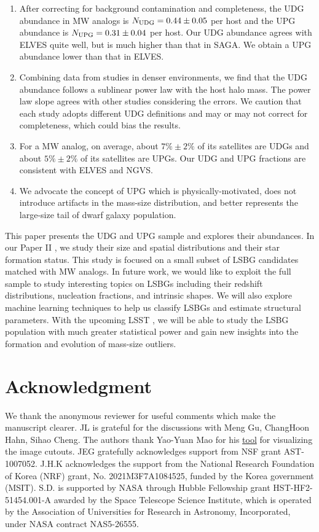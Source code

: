 \documentclass[twocolumn,astrosymb,twocolappendix,linenumbers]{aastex631}
\begin{document}
\begin{CJK*}{UTF8}{gbsn}
\begin{enumerate}
    \item After correcting for background contamination and completeness, the UDG abundance in MW analogs is $N_{\rm UDG} = 0.44\pm 0.05$ per host and the UPG abundance is $N_{\rm UPG} = 0.31 \pm 0.04$ per host. Our UDG abundance agrees with ELVES quite well, but is much higher than that in SAGA. We obtain a UPG abundance lower than that in ELVES.
    
    \item Combining data from studies in denser environments, we find that the UDG abundance follows a sublinear power law with the host halo mass. The power law slope agrees with other studies considering the errors. We caution that each study adopts different UDG definitions and may or may not correct for completeness, which could bias the results.
    
    \item For a MW analog, on average, about $7\%\pm2\%$ of its satellites are UDGs and about $5\%\pm2\%$ of its satellites are UPGs. Our UDG and UPG fractions are consistent with ELVES and NGVS.
    
    \item We advocate the concept of UPG which is physically-motivated, does not introduce artifacts in the mass-size distribution, and better represents the large-size tail of dwarf galaxy population. 
\end{enumerate}

This paper presents the UDG and UPG sample and explores their abundances. In our Paper II \citep{Li2023}, we study their size and spatial distributions and their star formation status. This study is focused on a small subset of LSBG candidates matched with MW analogs. In future work, we would like to exploit the full sample to study interesting topics on LSBGs including their redshift distributions, nucleation fractions, and intrinsic shapes. We will also explore machine learning techniques to help us classify LSBGs and estimate structural parameters. With the upcoming LSST \citep{lsst2009,LSST2019}, we will be able to study the LSBG population with much greater statistical power and gain new insights into the formation and evolution of mass-size outliers. 

\section*{Acknowledgment}
We thank the anonymous reviewer for useful comments which make the manuscript clearer.
JL is grateful for the discussions with Meng Gu, ChangHoon Hahn, Sihao Cheng. The authors thank Yao-Yuan Mao for his \href{https://github.com/yymao/decals-image-list-tool}{tool} for visualizing the image cutouts. JEG gratefully acknowledges support from NSF grant AST-1007052. J.H.K acknowledges the support from the National Research Foundation of Korea (NRF) grant, No. 2021M3F7A1084525, funded by the Korea government (MSIT). S.D. is supported by NASA through Hubble Fellowship grant HST-HF2-51454.001-A awarded by the Space Telescope Science Institute, which is operated by the Association of Universities for Research in Astronomy, Incorporated, under NASA contract NAS5-26555.


\end{CJK*}
\end{document}
